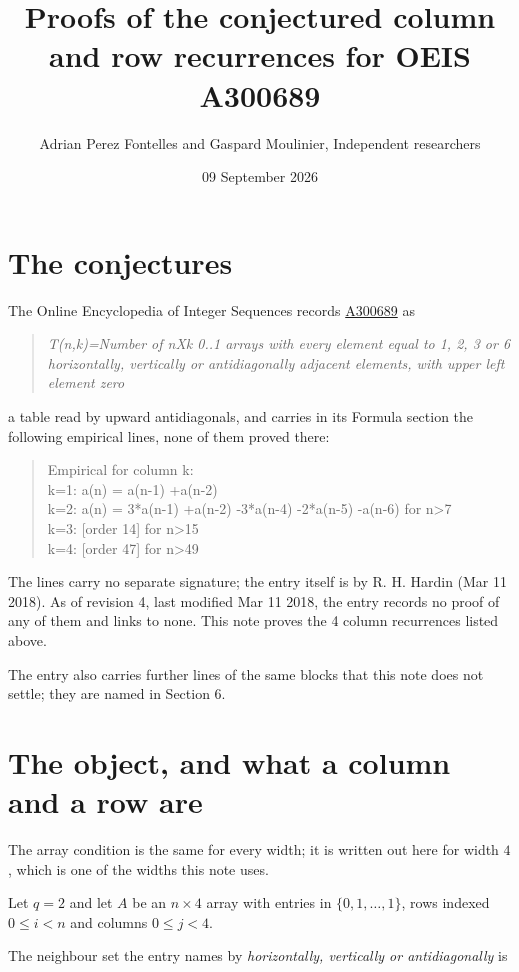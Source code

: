 \documentclass[11pt]{article}
\title{Proofs of the conjectured column and row recurrences for OEIS A300689}
\author{Adrian Perez Fontelles and Gaspard Moulinier, Independent researchers}
\date{09 September 2026}
\theoremstyle{definition}
\begin{document}
\maketitle
\section{The conjectures}

The Online Encyclopedia of Integer Sequences records \href{https://oeis.org/A300689}{A300689} as

\begin{quote}\itshape T(n,k)=Number of nXk 0..1 arrays with every element equal to 1, 2, 3 or 6 horizontally, vertically or antidiagonally adjacent elements, with upper left element zero\end{quote}

a table read by upward antidiagonals, and carries in its Formula section the following empirical lines, none of them proved there:

\begin{quote}\ttfamily Empirical for column k:\\
k=1: a(n) = a(n-1) +a(n-2)\\k=2: a(n) = 3*a(n-1) +a(n-2) -3*a(n-4) -2*a(n-5) -a(n-6) for n>7\\k=3: [order 14] for n>15\\k=4: [order 47] for n>49\end{quote}

The lines carry no separate signature; the entry itself is by R. H. Hardin (Mar 11 2018). As of revision 4, last modified Mar 11 2018, the entry records no proof of any of them and links to none. This note proves the 4 column recurrences listed above.

The entry also carries further lines of the same blocks that this note does not settle; they are named in Section 6.

\section{The object, and what a column and a row are}

The array condition is the same for every width; it is written out here for width $4$, which is one of the widths this note uses.

Let $q = 2$ and let $A$ be an $n \times 4$ array with entries in $\{0,1,\dots,1\}$, rows indexed $0 \le i < n$ and columns $0 \le j < 4$.

The neighbour set the entry names by {\itshape horizontally, vertically or antidiagonally} is
\end{document}
